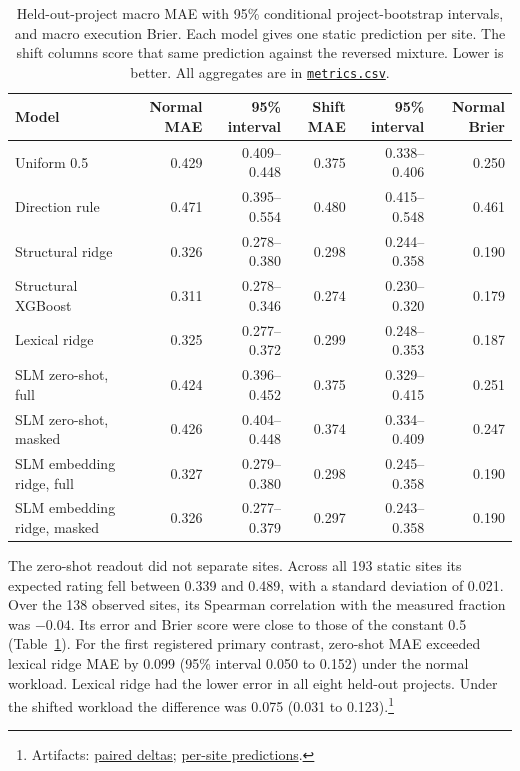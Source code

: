 \documentclass[11pt]{article}
\newcommand{\repocommit}{81d03caebe268d013b3163bcbff31cadabaaec21}
\newcommand{\repourl}{https://github.com/minggu151623/llm_profiling_research}
\newcommand{\repo}[2]{\href{\repourl/blob/\repocommit/#1}{#2}}
\newcommand{\artifacts}[1]{\footnote{Artifacts: #1.}}
\begin{document}
\begin{table}[t]
\centering
\small
\caption{Held-out-project macro MAE with 95\% conditional project-bootstrap intervals, and macro execution Brier. Each model gives one static prediction per site. The shift columns score that same prediction against the reversed mixture. Lower is better. All aggregates are in \repo{experiments/study/evaluation/metrics.csv}{\texttt{metrics.csv}}.}
\label{tab:results}
\begin{tabular}{@{}lrrrrr@{}}
\toprule
Model & Normal MAE & 95\% interval & Shift MAE & 95\% interval & Normal Brier \\
\midrule
Uniform 0.5 & 0.429 & 0.409--0.448 & 0.375 & 0.338--0.406 & 0.250 \\
Direction rule & 0.471 & 0.395--0.554 & 0.480 & 0.415--0.548 & 0.461 \\
Structural ridge & 0.326 & 0.278--0.380 & 0.298 & 0.244--0.358 & 0.190 \\
Structural XGBoost & 0.311 & 0.278--0.346 & 0.274 & 0.230--0.320 & 0.179 \\
Lexical ridge & 0.325 & 0.277--0.372 & 0.299 & 0.248--0.353 & 0.187 \\
SLM zero-shot, full & 0.424 & 0.396--0.452 & 0.375 & 0.329--0.415 & 0.251 \\
SLM zero-shot, masked & 0.426 & 0.404--0.448 & 0.374 & 0.334--0.409 & 0.247 \\
SLM embedding ridge, full & 0.327 & 0.279--0.380 & 0.298 & 0.245--0.358 & 0.190 \\
SLM embedding ridge, masked & 0.326 & 0.277--0.379 & 0.297 & 0.243--0.358 & 0.190 \\
\bottomrule
\end{tabular}
\end{table}

The zero-shot readout did not separate sites. Across all 193 static sites its expected rating fell between 0.339 and 0.489, with a standard deviation of 0.021. Over the 138 observed sites, its Spearman correlation with the measured fraction was $-0.04$. Its error and Brier score were close to those of the constant 0.5 (Table~\ref{tab:results}). For the first registered primary contrast, zero-shot MAE exceeded lexical ridge MAE by 0.099 (95\% interval 0.050 to 0.152) under the normal workload. Lexical ridge had the lower error in all eight held-out projects. Under the shifted workload the difference was 0.075 (0.031 to 0.123).\artifacts{\repo{experiments/study/evaluation/paired_deltas.csv}{paired deltas}; \repo{experiments/study/evaluation/predictions.csv}{per-site predictions}}
\end{document}
